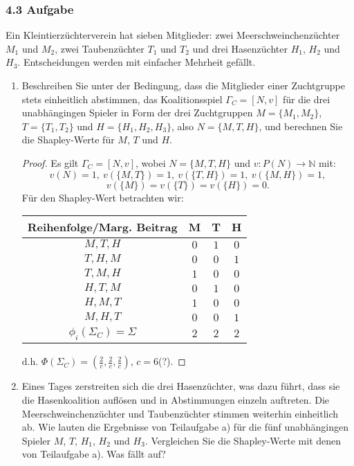 \documentclass[12pt]{extreport} %
\newcommand{\N}{\mathbb{N}}
\theoremstyle{named}
\theoremstyle{itshape}
\theoremstyle{normal}
\begin{document}
\subsubsection*{4.3 Aufgabe}

Ein Kleintierzüchterverein hat sieben Mitglieder: zwei Meerschweinchenzüchter $M_1$ und $M_2$, zwei Taubenzüchter $T_1$ und $T_2$ und drei Hasenzüchter $H_1$, $H_2$ und $H_3$. Entscheidungen werden mit einfacher Mehrheit gefällt.

  \begin{enumerate}
 	\item Beschreiben Sie unter der Bedingung, dass die Mitglieder einer Zuchtgruppe stets einheitlich abstimmen, das Koalitionsspiel $\Gamma_C = [N, v]$ für die drei unabhängingen Spieler in Form der drei Zuchtgruppen $M = \{M_1,M_2\}$, $T = \{T_1, T_2\}$ und $H = \{H_1,H_2,H_3\}$, also $N = \{M, T, H\}$, und berechnen Sie die Shapley-Werte für $M$, $T$ und $H$.
 		\begin{proof}
 			Es gilt $\Gamma_C = [N, v]$, wobei $N = \{ M, T, H \}$ und $v \colon P(N) \rightarrow \N$ mit:
 			$$ v(N) = 1, ~ v(\{M, T\}) = 1, ~ v(\{T, H\}) = 1, ~ v(\{M,H\}) = 1,$$
 			$$  v(\{M\}) = v(\{T\}) = v(\{H\}) = 0. $$
			Für den Shapley-Wert betrachten wir:
  			\begin{center}
    			\begin{tabular}{| c | c | c | c |}
   					\hline
    					Reihenfolge/Marg. Beitrag & M & T & H \\ 
    						\hline
    					$M, T, H$ & $0$ & $1$ & $0$  \\ 
    						\hline
    					$T, H, M$ & $0$ & $0$ & $1$  \\
    						\hline
    					$T, M, H$ & $1$ & $0$ & $0$  \\
       						\hline
    					$H, T, M$ & $0$ & $1$ & $0$  \\
      						\hline
    					$H, M, T$ & $1$ & $0$ & $0$  \\
      						\hline
    					$M, H, T$ & $0$ & $0$ & $1$  \\
      						\hline \hline
    					$\phi_{i}(\Sigma_{C}) = \Sigma$  & $2$ & $2$ & $2$  \\
    				\hline
   				 \end{tabular}
    		\end{center}
    		d.h. $\Phi(\Sigma_{C}) = \left(\frac{2}{c}, \frac{2}{c}, \frac{2}{c} \right)$, $c = 6$(?).
 		\end{proof}
	\item Eines Tages zerstreiten sich die drei Hasenzüchter, was dazu führt, dass sie die Hasenkoalition auflösen und in Abstimmungen einzeln auftreten. Die Meerschweinchenzüchter und Taubenzüchter stimmen weiterhin einheitlich ab. Wie lauten die Ergebnisse von Teilaufgabe a) für die fünf unabhängingen Spieler $M$, $T$, $H_1$, $H_2$ und $H_3$. Vergleichen Sie die Shapley-Werte mit denen von Teilaufgabe a). Was fällt auf?

\end{enumerate}
\end{document}
